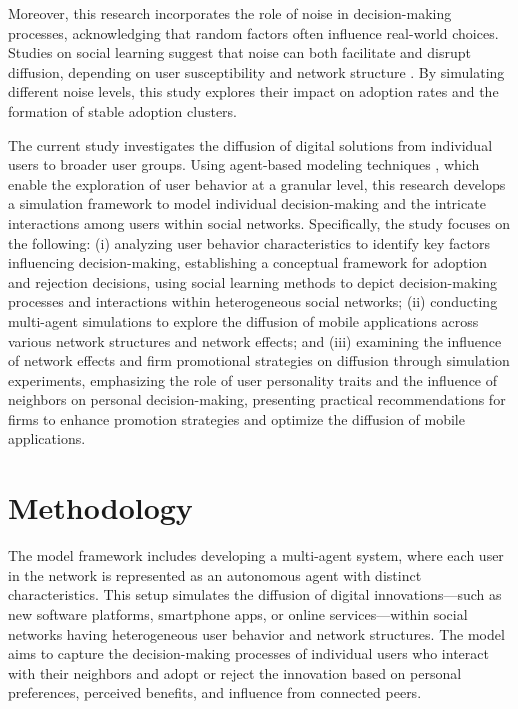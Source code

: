 \documentclass{article} %
\begin{document}
Moreover, this research incorporates the role of noise in decision-making processes, acknowledging that random factors often influence real-world choices. Studies on social learning suggest that noise can both facilitate and disrupt diffusion, depending on user susceptibility and network structure \cite{young_individual_1998}. By simulating different noise levels, this study explores their impact on adoption rates and the formation of stable adoption clusters.

The current study investigates the diffusion of digital solutions from individual users to broader user groups. Using agent-based modeling techniques \cite{jiang2020review, yi2018management}, which enable the exploration of user behavior at a granular level, this research develops a simulation framework to model individual decision-making and the intricate interactions among users within social networks. Specifically, the study focuses on the following: (i) analyzing user behavior characteristics to identify key factors influencing decision-making, establishing a conceptual framework for adoption and rejection decisions, using social learning methods to depict decision-making processes and interactions within heterogeneous social networks; (ii) conducting multi-agent simulations to explore the diffusion of mobile applications across various network structures and network effects; and (iii) examining the influence of network effects and firm promotional strategies on diffusion through simulation experiments, emphasizing the role of user personality traits and the influence of neighbors on personal decision-making, presenting practical recommendations for firms to enhance promotion strategies and optimize the diffusion of mobile applications.

\section{Methodology}

The model framework includes developing a multi-agent system, where each user in the network is represented as an autonomous agent with distinct characteristics. This setup simulates the diffusion of digital innovations—such as new software platforms, smartphone apps, or online services—within social networks having heterogeneous user behavior and network structures. The model aims to capture the decision-making processes of individual users who interact with their neighbors and adopt or reject the innovation based on personal preferences, perceived benefits, and influence from connected peers. 
\end{document}
